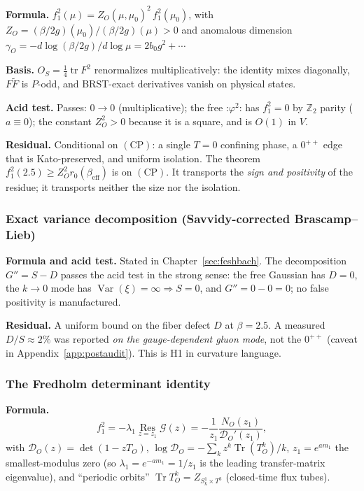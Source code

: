 \textbf{Formula.}
$f_1^2(\mu)=Z_O(\mu,\mu_0)^2\,f_1^2(\mu_0)$, with
$Z_O=(\beta/2g)(\mu_0)/(\beta/2g)(\mu)>0$ and anomalous dimension
$\gamma_O=-d\log(\beta/2g)/d\log\mu=2b_0g^2+\cdots$

\textbf{Basis.} $O_S=\tfrac14\operatorname{tr}F^2$ renormalizes multiplicatively: the identity
mixes diagonally, $F\tilde F$ is $P$-odd, and BRST-exact derivatives vanish on physical states.

\textbf{Acid test.} Passes: $0\to0$ (multiplicative); the free $\mathord{:}\varphi^2\mathord{:}$
has $f_1^2=0$ by $\mathbb{Z}_2$ parity ($a\equiv0$); the constant $Z_O^2>0$ because it is a
square, and is $O(1)$ in $V$.

\textbf{Residual.} Conditional on $(\mathrm{CP})$: a single $T=0$ confining phase, a $0^{++}$
edge that is Kato-preserved, and uniform isolation. The theorem
$f_1^2(2.5)\ge Z_O^2r_0(\beta_{\mathrm{eff}})$ is \LC{} on $(\mathrm{CP})$. It transports the
\emph{sign and positivity} of the residue; it transports neither the size nor the isolation.

\subsubsection{Exact variance decomposition (Savvidy-corrected Brascamp--Lieb)}

\textbf{Formula and acid test.} Stated in Chapter~\ref{sec:feshbach}. The decomposition $G''=S-D$
passes the acid test in the strong sense: the free Gaussian has $D=0$, the $k\to0$ mode has
$\operatorname{Var}(\xi)=\infty\Rightarrow S=0$, and $G''=0-0=0$; no false positivity is
manufactured.

\textbf{Residual.} A uniform bound on the fiber defect $D$ at $\beta=2.5$. A measured
$D/S\approx2\%$ was reported \emph{on the gauge-dependent gluon mode}, not the $0^{++}$
(caveat in Appendix~\ref{app:postaudit}). This is H1 in curvature language.

\subsubsection{The Fredholm determinant identity}

\textbf{Formula.}
\begin{equation}
f_1^2=-\lambda_1\operatorname*{Res}_{z=z_1}\mathcal{G}(z)
=-\frac{1}{z_1}\frac{N_O(z_1)}{\mathcal{D}_O'(z_1)},
\label{eq:fredholm}
\end{equation}
with $\mathcal{D}_O(z)=\det(1-zT_O)$,
$\log \mathcal{D}_O=-\sum_k z^k\operatorname{Tr}(T_O^k)/k$, $z_1=e^{am_1}$ the smallest-modulus
zero (so $\lambda_1=e^{-am_1}=1/z_1$ is the leading transfer-matrix eigenvalue), and ``periodic
orbits'' $\operatorname{Tr}T_O^k=Z_{S^1_k\times T^3}$ (closed-time flux tubes).


